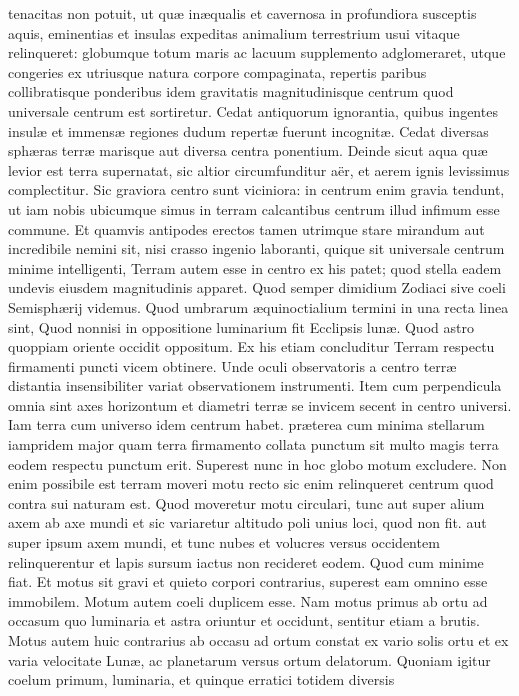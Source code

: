 \documentclass[11pt,a4paper]{article}
\begin{document}
tenacitas non potuit, ut quæ inæqualis et cavernosa  in profundiora susceptis aquis, eminentias et insulas expeditas animalium terrestrium usui vitaque relinqueret: globumque totum maris ac lacuum supplemento adglomeraret, utque congeries ex utriusque natura corpore compaginata, repertis paribus collibratisque ponderibus idem gravitatis magnitudinisque centrum quod universale centrum est  sortiretur. Cedat antiquorum ignorantia, quibus ingentes insulæ et immensæ regiones dudum repertæ fuerunt incognitæ. Cedat  diversas sphæras terræ marisque aut diversa centra ponentium.
Deinde sicut aqua quæ levior est terra supernatat, sic altior circumfunditur aër, et aerem ignis levissimus complectitur. Sic graviora centro sunt viciniora: in centrum enim gravia tendunt, ut iam nobis ubicumque simus in terram calcantibus centrum illud infimum esse commune. Et quamvis antipodes erectos tamen utrimque stare mirandum aut incredibile nemini sit, nisi crasso ingenio laboranti, quique sit universale centrum minime intelligenti, Terram autem esse in centro ex his patet; quod stella eadem undevis eiusdem magnitudinis apparet. Quod semper dimidium Zodiaci sive coeli Semisphærij videmus. Quod umbrarum æquinoctialium termini in una recta linea sint, Quod nonnisi in oppositione luminarium fit Ecclipsis lunæ. Quod astro quoppiam oriente occidit oppositum. Ex his etiam concluditur Terram respectu firmamenti puncti vicem obtinere. Unde oculi observatoris a centro terræ distantia insensibiliter variat observationem instrumenti. Item cum perpendicula omnia sint axes horizontum et diametri terræ se invicem secent in centro universi. Iam terra cum universo idem centrum habet. præterea cum minima stellarum iampridem major quam terra firmamento collata punctum sit multo magis terra eodem respectu punctum erit. Superest nunc in hoc globo motum excludere. Non enim possibile est terram moveri motu recto sic enim relinqueret centrum quod contra sui naturam est. Quod moveretur motu circulari, tunc aut super alium axem ab axe mundi et sic variaretur altitudo poli unius loci, quod non fit. aut super ipsum axem mundi, et tunc nubes et volucres versus occidentem relinquerentur et lapis sursum iactus non recideret eodem. Quod cum minime fiat. Et motus sit gravi et quieto corpori contrarius, superest eam omnino esse immobilem. Motum autem coeli duplicem esse. Nam motus primus ab ortu ad occasum quo luminaria et astra oriuntur et occidunt, sentitur etiam a brutis. Motus autem huic contrarius ab occasu ad ortum constat ex vario solis ortu et ex varia velocitate Lunæ, ac planetarum versus ortum delatorum. Quoniam igitur coelum primum, luminaria, et quinque erratici totidem diversis
\end{document}
